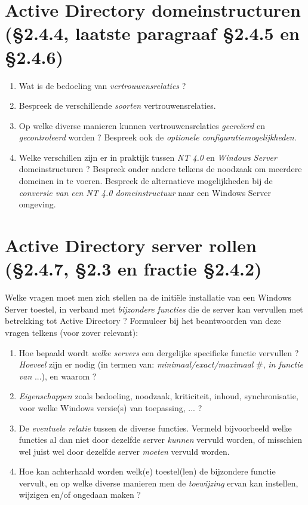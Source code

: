 \documentclass{report}
\begin{document}
 	\section{Active Directory domeinstructuren {\color{red}(§2.4.4, laatste paragraaf §2.4.5 en §2.4.6)}}
 	\begin{enumerate}
 		\item Wat is de bedoeling van \textit{vertrouwensrelaties} ?
 		
 		\item Bespreek de verschillende \textit{soorten} vertrouwensrelaties.
 		
 		\item Op welke diverse manieren kunnen vertrouwensrelaties \textit{gecreëerd} en \textit{gecontroleerd} worden ? Bespreek ook de \textit{optionele configuratiemogelijkheden}.
 		
 		\item Welke verschillen zijn er in praktijk tussen \textit{NT 4.0} en \textit{Windows Server} domeinstructuren ? Bespreek onder andere telkens de noodzaak om meerdere domeinen in te voeren. Bespreek de alternatieve mogelijkheden bij de \textit{conversie van een NT 4.0 domeinstructuur} naar een Windows Server omgeving.
 	\end{enumerate}
 
 	\section{Active Directory server rollen {\color{red}(§2.4.7, §2.3 en fractie §2.4.2)}}
 		Welke vragen moet men zich stellen na de initiële installatie van een Windows Server toestel, in verband met \textit{bijzondere functies} die de server kan vervullen met betrekking tot Active Directory ? Formuleer bij het beantwoorden van deze vragen telkens (voor zover relevant): 
 		\begin{enumerate}
 			\item Hoe bepaald wordt \textit{welke servers} een dergelijke specifieke functie vervullen ? \textit{Hoeveel} zijn er nodig (in termen van: \textit{minimaal/exact/maximaal} \#, \textit{in functie van} ...), en waarom ?
 		
 			\item \textit{Eigenschappen} zoals bedoeling, noodzaak, kriticiteit, inhoud, synchronisatie, voor welke Windows versie(s) van toepassing, ... ?
 		
 			\item De \textit{eventuele relatie} tussen de diverse functies. Vermeld bijvoorbeeld welke functies al dan niet door dezelfde server \textit{kunnen} vervuld worden, of misschien wel juist wel door dezelfde server \textit{moeten} vervuld worden.
 		
 			\item Hoe kan achterhaald worden welk(e) toestel(len) de bijzondere functie vervult, en op welke diverse manieren men de \textit{toewijzing} ervan kan instellen, wijzigen en/of ongedaan maken ?
 		\end{enumerate}	
\end{document}

